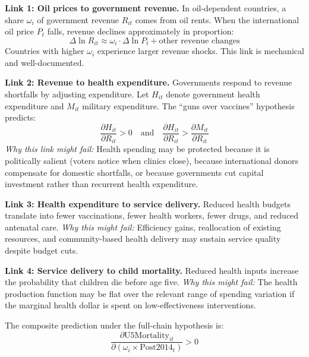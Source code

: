 \documentclass[12pt]{article}
\begin{document}
\textbf{Link 1: Oil prices to government revenue.} In oil-dependent countries, a share $\omega_i$ of government revenue $R_{it}$ comes from oil rents. When the international oil price $P_t$ falls, revenue declines approximately in proportion:
\begin{equation}
\Delta \ln R_{it} \approx \omega_i \cdot \Delta \ln P_t + \text{other revenue changes}
\end{equation}
Countries with higher $\omega_i$ experience larger revenue shocks. This link is mechanical and well-documented.

\textbf{Link 2: Revenue to health expenditure.} Governments respond to revenue shortfalls by adjusting expenditure. Let $H_{it}$ denote government health expenditure and $M_{it}$ military expenditure. The ``guns over vaccines'' hypothesis predicts:
\begin{equation}
\frac{\partial H_{it}}{\partial R_{it}} > 0 \quad \text{and} \quad \frac{\partial H_{it}}{\partial R_{it}} > \frac{\partial M_{it}}{\partial R_{it}}
\end{equation}
\textit{Why this link might fail:} Health spending may be protected because it is politically salient (voters notice when clinics close), because international donors compensate for domestic shortfalls, or because governments cut capital investment rather than recurrent health expenditure.

\textbf{Link 3: Health expenditure to service delivery.} Reduced health budgets translate into fewer vaccinations, fewer health workers, fewer drugs, and reduced antenatal care. \textit{Why this might fail:} Efficiency gains, reallocation of existing resources, and community-based health delivery may sustain service quality despite budget cuts.

\textbf{Link 4: Service delivery to child mortality.} Reduced health inputs increase the probability that children die before age five. \textit{Why this might fail:} The health production function may be flat over the relevant range of spending variation if the marginal health dollar is spent on low-effectiveness interventions.

The composite prediction under the full-chain hypothesis is:
\begin{equation}
\frac{\partial \text{U5Mortality}_{it}}{\partial (\omega_i \times \text{Post2014}_t)} > 0
\end{equation}
\end{document}
